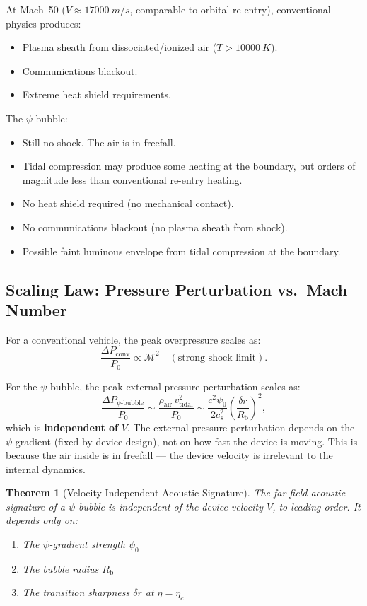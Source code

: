 \documentclass[12pt, letterpaper]{article}
\newtheorem{theorem}{Theorem}
\theoremstyle{definition}
\theoremstyle{remark}
\newcommand{\etac}{\eta_c}
\newcommand{\Rbub}{R_{\mathrm{b}}}
\newcommand{\cs}{c_s}
\newcommand{\Mach}{\mathcal{M}}
\begin{document}
At Mach~50 ($V \approx \SI{17000}{m/s}$, comparable to orbital re-entry),
conventional physics produces:
\begin{itemize}
\item Plasma sheath from dissociated/ionized air ($T > \SI{10000}{K}$).
\item Communications blackout.
\item Extreme heat shield requirements.
\end{itemize}

The $\psi$-bubble:
\begin{itemize}
\item Still no shock. The air is in freefall.
\item Tidal compression may produce some heating at the boundary, but orders
of magnitude less than conventional re-entry heating.
\item No heat shield required (no mechanical contact).
\item No communications blackout (no plasma sheath from shock).
\item Possible faint luminous envelope from tidal compression at the boundary.
\end{itemize}

\subsection{Scaling Law: Pressure Perturbation vs.\ Mach Number}

For a conventional vehicle, the peak overpressure scales as:
\begin{equation}
\frac{\Delta P_{\mathrm{conv}}}{P_0} \propto \Mach^2 \quad (\text{strong shock limit}).
\end{equation}

For the $\psi$-bubble, the peak external pressure perturbation scales as:
\begin{equation}
\frac{\Delta P_{\psi\text{-bubble}}}{P_0} \sim \frac{\rho_{\mathrm{air}}\,
v_{\mathrm{tidal}}^2}{P_0}
\sim \frac{c^2 \psi_0}{2\cs^2}\left(\frac{\delta r}{\Rbub}\right)^2,
\label{eq:pressure-scaling}
\end{equation}
which is \textbf{independent of} $V$. The external pressure perturbation
depends on the $\psi$-gradient (fixed by device design), not on how fast the
device is moving. This is because the air inside is in freefall --- the device
velocity is irrelevant to the internal dynamics.

\begin{theorem}[Velocity-Independent Acoustic Signature]
\label{thm:v-independent}
The far-field acoustic signature of a $\psi$-bubble is independent of the
device velocity $V$, to leading order. It depends only on:
\begin{enumerate}
\item The $\psi$-gradient strength $\psi_0$
\item The bubble radius $\Rbub$
\item The transition sharpness $\delta r$ at $\eta = \etac$
\end{enumerate}
\end{theorem}
\end{document}
